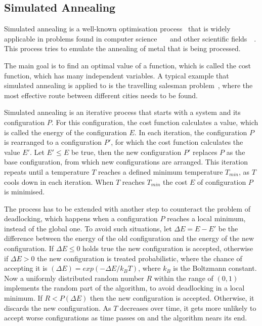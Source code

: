 \documentclass[draft,final]{vutinfth} %
\begin{document}
\subsection{Simulated Annealing}
Simulated annealing is a well-known optimisation process~\cite{kirkpatrick1983optimization} that is widely applicable in problems found in computer science~\cite{goffe1994global}~\cite{dekkers1991global}~\cite{brooks1995optimization} and other scientific fields~\cite{pannetier1990prediction}~\cite{sutter1995automated}. This process tries to emulate the annealing of metal that is being processed.

The main goal is to find an optimal value of a function, which is called the cost function, which has many independent variables. A typical example that simulated annealing is applied to is the travelling salesman problem~\cite{malek1989serial}, where the most effective route between different cities needs to be found. 

Simulated annealing is an iterative process that starts with a system and its configuration $P$. For this configuration, the cost function calculates a value, which is called the energy of the configuration $E$. In each iteration, the configuration $P$ is rearranged to a configuration $P'$, for which the cost function calculates the value $E'$. Let $E' \leq E$ be true, then the new configuration $P'$ replaces $P$ as the base configuration, from which new configurations are arranged. This iteration repeats until a temperature $T$ reaches a defined minimum temperature $T_{min}$, as $T$ cools down in each iteration. When $T$ reaches $T_{min}$ the cost $E$ of configuration $P$ is minimised.

The process has to be extended with another step to counteract the problem of deadlocking, which happens when a configuration $P$ reaches a local minimum, instead of the global one. To avoid such situations, let $\Delta E = E - E'$ be the difference between the energy of the old configuration and the energy of the new configuration. If $\Delta E \leq 0$ holds true the new configuration is accepted, otherwise if $\Delta E > 0$ the new configuration is treated probabilistic, where the chance of accepting it is $(\Delta E) = exp(-\Delta E / k_B T)$, where $k_B$ is the Boltzmann constant. Now a uniformly distributed random number $R$ within the range of $(0,1)$ implements the random part of the algorithm, to avoid deadlocking in a local minimum. If $R < P(\Delta E)$ then the new configuration is accepted. Otherwise, it discards the new configuration. As $T$ decreases over time, it gets more unlikely to accept worse configurations as time passes on and the algorithm nears its end.
\end{document}
